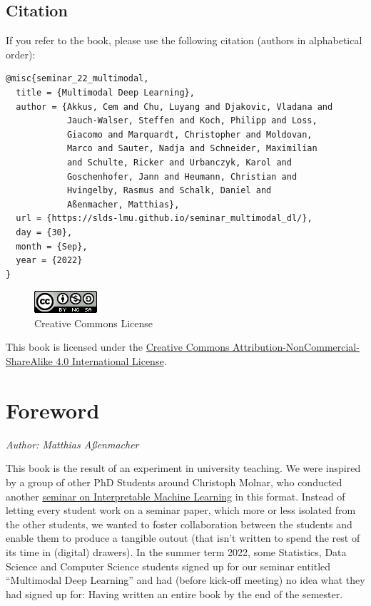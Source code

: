 \documentclass[
]{krantz}
\begin{document}
\hypertarget{citation}{%
\section*{Citation}\label{citation}}


If you refer to the book, please use the following citation (authors in alphabetical order):

\begin{verbatim}
@misc{seminar_22_multimodal,
  title = {Multimodal Deep Learning},
  author = {Akkus, Cem and Chu, Luyang and Djakovic, Vladana and
            Jauch-Walser, Steffen and Koch, Philipp and Loss,
            Giacomo and Marquardt, Christopher and Moldovan,
            Marco and Sauter, Nadja and Schneider, Maximilian
            and Schulte, Ricker and Urbanczyk, Karol and
            Goschenhofer, Jann and Heumann, Christian and
            Hvingelby, Rasmus and Schalk, Daniel and
            Aßenmacher, Matthias},
  url = {https://slds-lmu.github.io/seminar_multimodal_dl/},
  day = {30},
  month = {Sep},
  year = {2022}
}
\end{verbatim}

\begin{figure}
\centering
\includegraphics{figures/by-nc-sa.png}
\caption{Creative Commons License}
\end{figure}

This book is licensed under the \href{http://creativecommons.org/licenses/by-nc-sa/4.0/}{Creative Commons Attribution-NonCommercial-ShareAlike 4.0 International License}.

\mainmatter

\hypertarget{foreword}{%
\chapter*{Foreword}\label{foreword}}


\emph{Author: Matthias Aßenmacher}

This book is the result of an experiment in university teaching. We were inspired by a group of other PhD Students around Christoph Molnar, who conducted another \href{https://compstat-lmu.github.io/iml_methods_limitations/}{seminar on Interpretable Machine Learning} in this format.
Instead of letting every student work on a seminar paper, which more or less isolated from the other students, we wanted to foster collaboration between the students and enable them to produce a tangible outout (that isn't written to spend the rest of its time in (digital) drawers).
In the summer term 2022, some Statistics, Data Science and Computer Science students signed up for our seminar entitled ``Multimodal Deep Learning'' and had (before kick-off meeting) no idea what they had signed up for: Having written an entire book by the end of the semester.
\end{document}
